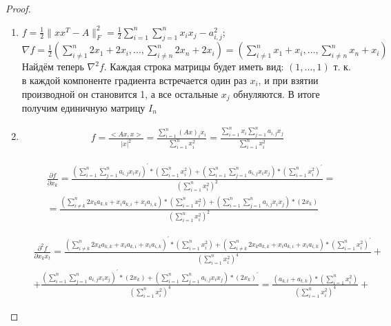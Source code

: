 \documentclass[a4paper]{article}
\begin{document}
\begin{proof}
    \begin{enumerate}[label=(\alph*)]
        \item $f = \frac{1}{2}\|xx^T-A \|^2_F = \frac{1}{2}\sum _{i = 1}^n \sum _{j = 1}^n x_i x_j - a_{i, j}^2$; \newline
        $\nabla f = \frac{1}{2}(\sum _{i \neq 1}^n 2x_1 + 2x_i, ..., \sum _{i \neq n}^n 2x_n + 2x_i) = (\sum _{i \neq 1}^n x_1 + x_i, ..., \sum _{i \neq n}^n x_n + x_i)$
        \newline Найдём теперь $\nabla ^2 f$. Каждая строка матрицы будет иметь вид: $(1, ..., 1)$ т. к. в каждой компоненте градиента встречается один раз $x_i$, и при взятии производной он становится 1, а все остальные $x_j$ обнуляются. В итоге получим единичную матрицу $I_n$
        
        \item \begin{align*}
        f = \frac{<Ax, x>}{|x|^2} = \frac{\sum _{i = 1} ^n (Ax)_{i} x_i}{\sum _{i = 1} ^n x_i^2} = \frac{\sum _{i = 1} ^n x_i \sum_{j = 1}^n a_{i, j}x_j}{\sum _{i = 1} ^n x_i^2}
        \end{align*}
        
        \begin{align*}
        &\frac{\partial  f}{\partial x_k} = \frac{(\sum _{i = 1} ^n  \sum_{j = 1}^n a_{i, j} x_i x_j)^{'}*(\sum _{i = 1} ^n x_i^2) + (\sum _{i = 1} ^n  \sum_{j = 1}^n a_{i, j} x_i x_j)*(\sum _{i = 1} ^n x_i^2)^{'}}{(\sum _{i = 1} ^n x_i^2)^2} = \\ &= \frac{(\sum _{i \neq k}^n 2x_k a_{k, k} + x_i a_{k, i} + x_i a_{i, k})*(\sum _{i = 1} ^n x_i^2) + (\sum _{i = 1} ^n \sum_{j = 1}^n a_{i, j} x_i x_j)*(2x_k)}{(\sum _{i = 1} ^n x_i^2)^2}
        \end{align*}
        
        \begin{align*}
        &\frac{\partial ^2 f}{\partial x_k x_t} = \frac{(\sum _{i \neq k}^n 2x_k a_{k, k} + x_i a_{k, i} + x_i a_{i, k})^{'}*(\sum _{i = 1} ^n x_i^2) + (\sum _{i \neq k}^n 2x_k a_{k, k} + x_i a_{k, i} + x_i a_{i, k})*(\sum _{i = 1} ^n x_i^2)^{'}}{(\sum _{i = 1} ^n x_i^2)^4} + \\ &+  \frac{(\sum _{i = 1} ^n \sum_{j = 1}^n a_{i, j} x_i x_j)^{'}*(2x_k) + (\sum _{i = 1} ^n \sum_{j = 1}^n a_{i, j} x_i x_j)*(2x_k)^{'}}{(\sum _{i = 1} ^n x_i^2)^4} = \frac{(a_{k, t} + a_{t, k})*(\sum _{i = 1} ^n x_i^2)}{(\sum _{i = 1} ^n x_i^2)^4} +
        \end{align*}
        

\end{enumerate}
\end{proof}
\end{document}
